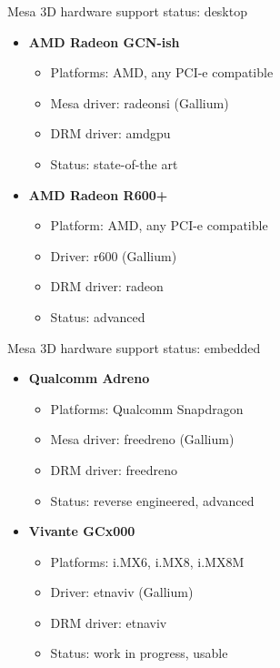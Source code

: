 \begin{frame}{Mesa 3D hardware support status: desktop}
  \begin{itemize}
  \item \textbf{AMD Radeon GCN-ish}
    \begin{itemize}
    \item Platforms: AMD, any PCI-e compatible
    \item Mesa driver: radeonsi (Gallium)
    \item DRM driver: amdgpu
    \item Status: state-of-the art
    \end{itemize}
  \item \textbf{AMD Radeon R600+}
    \begin{itemize}
    \item Platform: AMD, any PCI-e compatible
    \item Driver: r600 (Gallium)
    \item DRM driver: radeon
    \item Status: advanced
    \end{itemize}
  \end{itemize}
\end{frame}

\begin{frame}{Mesa 3D hardware support status: embedded}
  \begin{itemize}
  \item \textbf{Qualcomm Adreno}
    \begin{itemize}
    \item Platforms: Qualcomm Snapdragon
    \item Mesa driver: freedreno (Gallium)
    \item DRM driver: freedreno
    \item Status: reverse engineered, advanced
    \end{itemize}
  \item \textbf{Vivante GCx000}
    \begin{itemize}
    \item Platforms: i.MX6, i.MX8, i.MX8M
    \item Driver: etnaviv (Gallium)
    \item DRM driver: etnaviv
    \item Status: work in progress, usable
    \end{itemize}
  \end{itemize}
\end{frame}

